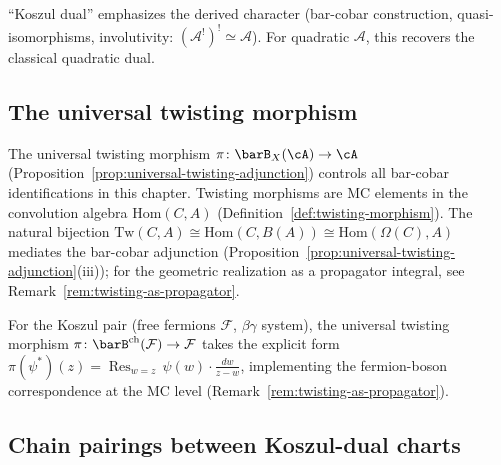 \begin{remark}
``Koszul dual'' emphasizes the derived character
(bar-cobar construction, quasi-isomorphisms, involutivity:
$(\mathcal{A}^!)^! \simeq \mathcal{A}$). For quadratic $\mathcal{A}$,
this recovers the classical quadratic dual.
\end{remark}

\subsection{The universal twisting morphism}

The universal twisting morphism
$\pi\colon \barB_X(\cA) \to \cA$
(Proposition~\ref{prop:universal-twisting-adjunction}) controls
all bar-cobar identifications in this chapter. Twisting morphisms
are MC elements in the convolution algebra $\mathrm{Hom}(C, A)$
(Definition~\ref{def:twisting-morphism}). The natural bijection
$\mathrm{Tw}(C, A) \cong \mathrm{Hom}(C, B(A)) \cong
\mathrm{Hom}(\Omega(C), A)$
mediates the bar-cobar adjunction
(Proposition~\ref{prop:universal-twisting-adjunction}(iii)); for the
geometric realization as a propagator integral, see
Remark~\ref{rem:twisting-as-propagator}.

\begin{example}
\label{ex:fermion-boson-twisting}
For the Koszul pair (free fermions $\mathcal{F}$, $\beta\gamma$
system), the universal twisting morphism
$\pi\colon \barB^{\mathrm{ch}}(\mathcal{F}) \to \mathcal{F}$
takes the explicit form
$\pi(\psi^*)(z) = \operatorname{Res}_{w=z}\, \psi(w) \cdot \frac{dw}{z-w}$,
implementing the fermion-boson correspondence at the MC level
(Remark~\ref{rem:twisting-as-propagator}).
\end{example}

\subsection{Chain pairings between Koszul-dual charts}
\label{subsec:hochschild-duality}

